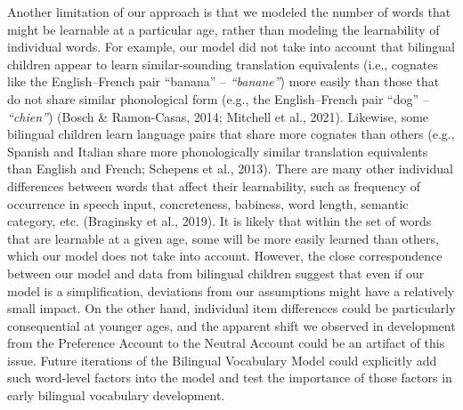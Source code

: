 \documentclass[
  english,
  ,man,floatsintext]{apa6}
\begin{document}
Another limitation of our approach is that we modeled the number of words that might be learnable at a particular age, rather than modeling the learnability of individual words. For example, our model did not take into account that bilingual children appear to learn similar-sounding translation equivalents (i.e., cognates like the English--French pair ``banana'' -- \emph{``banane''}) more easily than those that do not share similar phonological form (e.g., the English--French pair ``dog'' -- \emph{``chien''}) (Bosch \& Ramon-Casas, 2014; Mitchell et al., 2021). Likewise, some bilingual children learn language pairs that share more cognates than others (e.g., Spanish and Italian share more phonologically similar translation equivalents than English and French; Schepens et al., 2013). There are many other individual differences between words that affect their learnability, such as frequency of occurrence in speech input, concreteness, babiness, word length, semantic category, etc. (Braginsky et al., 2019). It is likely that within the set of words that are learnable at a given age, some will be more easily learned than others, which our model does not take into account. However, the close correspondence between our model and data from bilingual children suggest that even if our model is a simplification, deviations from our assumptions might have a relatively small impact. On the other hand, individual item differences could be particularly consequential at younger ages, and the apparent shift we observed in development from the Preference Account to the Neutral Account could be an artifact of this issue. Future iterations of the Bilingual Vocabulary Model could explicitly add such word-level factors into the model and test the importance of those factors in early bilingual vocabulary development.
\end{document}
